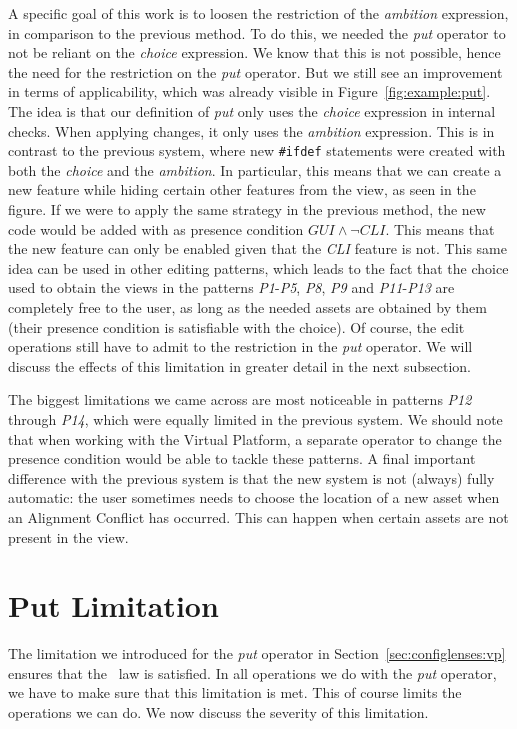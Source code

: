 A specific goal of this work is to loosen the restriction of the \emph{ambition} expression,
in comparison to the previous method. To do this, we needed the \emph{put} operator
to not be reliant on the \emph{choice} expression. We know that this is not possible,
hence the need for the restriction on the \emph{put} operator. But we still see an
improvement in terms of applicability, which was already visible in Figure~\ref{fig:example:put}.
The idea is that our definition of \emph{put} only uses the \emph{choice} expression
in internal checks. When applying changes, it only uses the \emph{ambition} expression.
This is in contrast to the previous system, where new \texttt{\#ifdef} statements were
created with both the \emph{choice} and the \emph{ambition}. In particular, this means
that we can create a new feature while hiding certain other features from the view,
as seen in the figure. If we were to apply the same strategy in the previous method, the
new code would be added with as presence condition \(\mathit{GUI} \land \neg\mathit{CLI}\).
This means that the new feature can only be enabled given that the \emph{CLI} feature is not.
This same idea can be used in other editing patterns, which leads to the fact that the 
choice used to obtain the views in the patterns \emph{P1}-\emph{P5}, \emph{P8}, \emph{P9}
and \emph{P11}-\emph{P13} are completely free to the user, as long as the needed assets
are obtained by them (their presence condition is satisfiable with the choice).
Of course, the edit operations still have to admit to the restriction in the 
\emph{put} operator. We will discuss the effects of this limitation in greater detail in 
the next subsection. 

The biggest limitations we came across are most noticeable in patterns
\emph{P12} through \emph{P14}, which were equally limited in the previous system.
We should note that when working with the Virtual Platform, a separate operator 
to change the presence condition would be able to tackle these patterns. A final
important difference with the previous system is that the new system is not (always)
fully automatic: the user sometimes needs to choose the location of a new asset 
when an Alignment Conflict has occurred. This can happen when certain assets are 
not present in the view.

\section{Put Limitation}
The limitation we introduced for the \emph{put} operator in
Section~\ref{sec:configlenses:vp} ensures that the \putget~law is satisfied.
In all operations we do with the \emph{put} operator, we have to make sure that
this limitation is met. This of course limits the operations we can do. We now
discuss the severity of this limitation.

